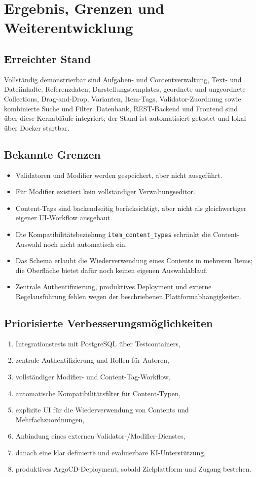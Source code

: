 ﻿\documentclass[11pt,a4paper]{article}
\begin{document}
\section{Ergebnis, Grenzen und Weiterentwicklung}
\subsection{Erreichter Stand}
Vollständig demonstrierbar sind Aufgaben- und Contentverwaltung, Text- und
Dateiinhalte, Referenzdaten, Darstellungstemplates, geordnete und ungeordnete
Collections, Drag-and-Drop, Varianten, Item-Tags, Validator-Zuordnung sowie
kombinierte Suche und Filter. Datenbank, REST-Backend und Frontend sind über
diese Kernabläufe integriert; der Stand ist automatisiert getestet und lokal
über Docker startbar.

\subsection{Bekannte Grenzen}
\begin{itemize}
\item Validatoren und Modifier werden gespeichert, aber nicht ausgeführt.
\item Für Modifier existiert kein vollständiger Verwaltungseditor.
\item Content-Tags sind backendseitig berücksichtigt, aber nicht als
gleichwertiger eigener UI-Workflow ausgebaut.
\item Die Kompatibilitätsbeziehung \texttt{item\_content\_types} schränkt die
Content-Auswahl noch nicht automatisch ein.
\item Das Schema erlaubt die Wiederverwendung eines Contents in mehreren
Items; die Oberfläche bietet dafür noch keinen eigenen Auswahlablauf.
\item Zentrale Authentifizierung, produktives Deployment und externe
Regelausführung fehlen wegen der beschriebenen Plattformabhängigkeiten.

\end{itemize}

\subsection{Priorisierte Verbesserungsmöglichkeiten}
\begin{enumerate}
\item Integrationstests mit PostgreSQL über Testcontainers,
\item zentrale Authentifizierung und Rollen für Autoren,
\item vollständiger Modifier- und Content-Tag-Workflow,
\item automatische Kompatibilitätsfilter für Content-Typen,
\item explizite UI für die Wiederverwendung von Contents und
Mehrfachzuordnungen,
\item Anbindung eines externen Validator-/Modifier-Dienstes,
\item danach eine klar definierte und evaluierbare KI-Unterstützung,
\item produktives ArgoCD-Deployment, sobald Zielplattform und Zugang bestehen.
\end{enumerate}
\end{document}
